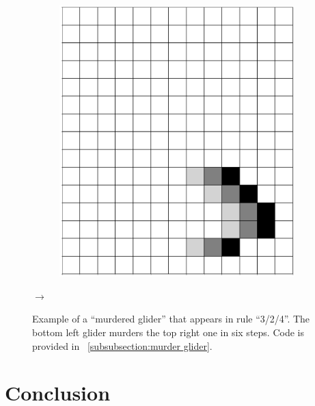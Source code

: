 \documentclass[12pt]{article}
\numberwithin{figure}{section} %
\begin{document}
\begin{figure}[H]
\begin{subfigure}{0.23\textwidth}
     	\subcaption{}
   	\end{subfigure}
	\begin{subfigure}{0.23\textwidth}
     	\includegraphics[width=\linewidth]{Section4/36.6}
     	\subcaption{}
   	\end{subfigure}
	{\LARGE$\rightarrow{}$}
   \caption[Example of a "murdered glider"]{Example of a “murdered glider” that appears in rule “3/2/4”. The bottom left glider murders the top right one in six steps. Code is provided in ~\ref{subsubsection:murder glider}.}
   \label{fig:murder glider}
\end{figure}

\newpage
\section{Conclusion}
\end{document}
